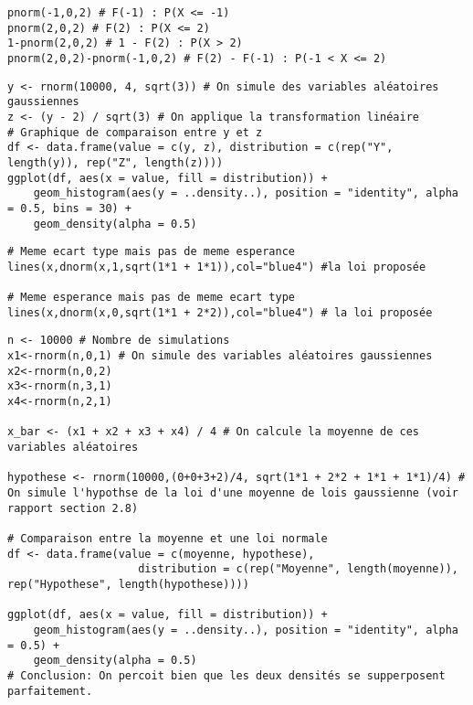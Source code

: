 \begin{lstlisting}[caption=Code : Probabilités par fonctions de répartition, label=lst:q6]
pnorm(-1,0,2) # F(-1) : P(X <= -1)
pnorm(2,0,2) # F(2) : P(X <= 2)
1-pnorm(2,0,2) # 1 - F(2) : P(X > 2)
pnorm(2,0,2)-pnorm(-1,0,2) # F(2) - F(-1) : P(-1 < X <= 2)
\end{lstlisting}

\begin{lstlisting}[caption=Code : Lien entre les lois normales, label=lst:lien_normales]
y <- rnorm(10000, 4, sqrt(3)) # On simule des variables aléatoires gaussiennes
z <- (y - 2) / sqrt(3) # On applique la transformation linéaire
# Graphique de comparaison entre y et z
df <- data.frame(value = c(y, z), distribution = c(rep("Y", length(y)), rep("Z", length(z))))
ggplot(df, aes(x = value, fill = distribution)) +
    geom_histogram(aes(y = ..density..), position = "identity", alpha = 0.5, bins = 30) +
    geom_density(alpha = 0.5)
\end{lstlisting}

\begin{lstlisting}[caption=Code : Sommes de variables aléatoires gaussiennes, label=lst:somme_gaussiennes]
# Meme ecart type mais pas de meme esperance
lines(x,dnorm(x,1,sqrt(1*1 + 1*1)),col="blue4") #la loi proposée

# Meme esperance mais pas de meme ecart type
lines(x,dnorm(x,0,sqrt(1*1 + 2*2)),col="blue4") # la loi proposée
\end{lstlisting}

\begin{lstlisting}[caption=Code : Démonstration de la loi d'une moyenne de lois gaussienne $\bar{X}$, label=lst:mean_gaussiennes]
n <- 10000 # Nombre de simulations
x1<-rnorm(n,0,1) # On simule des variables aléatoires gaussiennes
x2<-rnorm(n,0,2)
x3<-rnorm(n,3,1)
x4<-rnorm(n,2,1)

x_bar <- (x1 + x2 + x3 + x4) / 4 # On calcule la moyenne de ces variables aléatoires

hypothese <- rnorm(10000,(0+0+3+2)/4, sqrt(1*1 + 2*2 + 1*1 + 1*1)/4) # On simule l'hypothse de la loi d'une moyenne de lois gaussienne (voir rapport section 2.8)

# Comparaison entre la moyenne et une loi normale
df <- data.frame(value = c(moyenne, hypothese), 
                    distribution = c(rep("Moyenne", length(moyenne)), rep("Hypothese", length(hypothese))))

ggplot(df, aes(x = value, fill = distribution)) +
    geom_histogram(aes(y = ..density..), position = "identity", alpha = 0.5) +
    geom_density(alpha = 0.5)
# Conclusion: On percoit bien que les deux densités se supperposent parfaitement.
\end{lstlisting}



